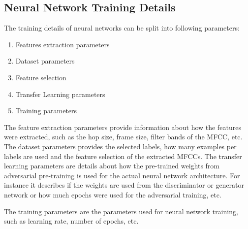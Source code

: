 \subsection{Neural Network Training Details}\label{sec:exp_details_training}
The training details of neural networks can be split into following parameters:
\begin{enumerate}
  \item Features extraction parameters
  \item Dataset parameters
  \item Feature selection
  \item Transfer Learning parameters
  \item Training parameters
\end{enumerate}
The feature extraction parameters provide information about how the features were extracted, such as the hop size, frame size, filter bands of the MFCC, etc.
The dataset parameters provides the selected labels, how many examples per labels are used and the feature selection of the extracted MFCCs. 
The transfer learning parameters are details about how the pre-trained weights from adversarial pre-training is used for the actual neural network architecture.
For instance it describes if the weights are used from the discriminator or generator network or how much epochs were used for the adversarial training, etc.
%

The training parameters are the parameters used for neural network training, such as learning rate, number of epochs, etc.
%

